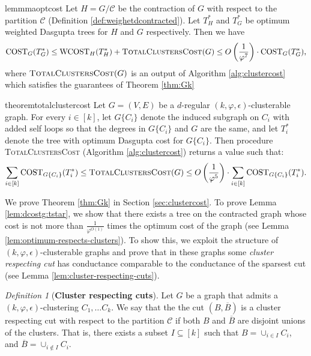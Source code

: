 \documentclass[letterpaper,11pt]{article}
\newcommand{\CT}{\text{COST}}
\newcommand{\wCT}{\text{WCOST}}
\newcommand{\cC}{\mathcal{C}}
\theoremstyle{plain}
\theoremstyle{definition}
\theoremstyle{remark}
\newtheorem{mydef}{Definition}
\newcommand{\e}{\epsilon}
\begin{document}
\begin{restatable}{lemmma}{optcost} \label{lem:dcostg:tstar}
Let $H = G/\cC$ be the contraction of $G$ with respect to the partition $\cC $ (Definition \ref{def:weighetdcontracted}). Let $T^*_H$ and $T^*_G$ be optimum weighted Dasgupta trees for $H$ and $G$ respectively. Then we have
\[ \CT_G(T^*_G) \leq \wCT_H(T^*_H) + \textsc{TotalClustersCost}(G) \leq O\left(\frac{1}{\varphi^7}\right) \cdot \CT_G(T^*_G) \text{,}\]
where $\textsc{TotalClustersCost}(G)$ is an output of Algorithm \ref{alg:clustercost} which satisfies the guarantees of Theorem \ref{thm:Gk}
\end{restatable}

\begin{restatable}{theorem}{totalclustercost}
\label{thm:Gk}
Let $G=(V,E)$ be a $d$-regular $(k,\varphi,\epsilon)$-clusterable graph. For every $i\in[k]$, let $G\{C_i\}$ denote the induced subgraph on $C_i$ with added self loops so that the degrees in $G\{C_i\}$ and $G$ are the same, and let $T^*_i$ denote the tree
	with optimum Dasgupta cost for $G\{C_i\}$. 
Then procedure \textsc{TotalClustersCost} (Algorithm \ref{alg:clustercost}) returns a value such that:
\[\sum_{i \in [k]} \CT_{G\{C_i\}}(T^*_i) \leq \textsc{TotalClustersCost}(G) \leq O\left(\frac{1}{\varphi^{5}}\right)\cdot \sum_{i \in [k]} \CT_{G\{C_i\}}(T^*_i) \text{.} \]
\end{restatable} 
We prove Theorem \ref{thm:Gk} in Section \ref{sec:clustercost}. 
To prove Lemma \ref{lem:dcostg:tstar}, we show that there exists a tree on the contracted graph whose cost is not more than $\frac{1}{\varphi^{O(1)}}$ times the optimum cost of the graph (see Lemma \ref{lem:optimum-respects-clusters}). To show this, we exploit the structure of $(k, \varphi, \e)$-clusterable graphs and prove that in these graphs some {\em cluster respecting cut} has conductance comparable to the conductance of the sparsest cut (see Lemma \ref{lem:cluster-respecting-cuts}).

\begin{mydef}[\textbf{Cluster respecting cuts}] \label{def:cluster:respecting:cut}
	Let $G$ be a graph that admits a $(k, \varphi, \epsilon)$-clustering
	$C_1, \ldots C_k$. We say that the the cut $(B,\overline{B})$ is a cluster respecting cut with 
	respect to the partition $\cC$ if both $B$ and $\overline{B}$
	are disjoint unions of the clusters. That is, there exists a subset $I \subseteq [k]$ such that 
	$B = \cup_{i \in I} C_i$, and $\overline{B} = \cup_{i \not\in I} C_i$.
\end{mydef}
\end{document}
